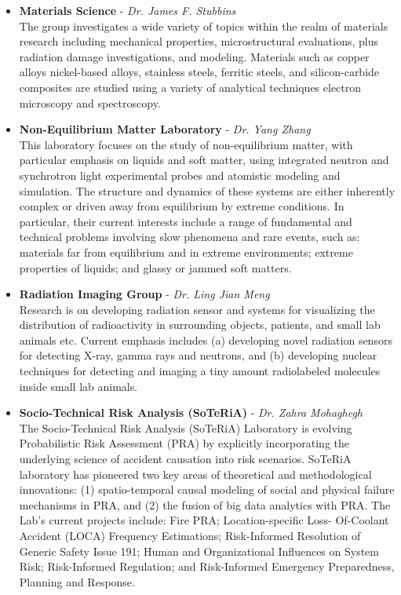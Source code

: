 \begin{itemize}
  \item \textbf{Materials Science} - \textit{Dr. James F. Stubbins}\\
  The group investigates a wide variety of topics within the realm of materials research including mechanical properties, microstructural evaluations, plus radiation damage investigations, and modeling. Materials such as copper alloys nickel-based alloys, stainless steels, ferritic steels, and silicon-carbide composites are studied using a variety of analytical techniques electron microscopy and spectroscopy.


  \item \textbf{Non-Equilibrium Matter Laboratory} - \textit{Dr. Yang Zhang}\\
  This laboratory focuses on the study of non-equilibrium matter, with particular emphasis on liquids and soft matter, using integrated neutron and synchrotron light experimental probes and atomistic modeling and simulation. The structure and dynamics of these systems are either inherently complex or driven away from equilibrium by extreme conditions. In particular, their current interests include a range of fundamental and technical problems involving slow phenomena and rare events, such as: materials far from equilibrium and in extreme environments; extreme properties of liquids; and glassy or jammed soft matters.

  \item \textbf{Radiation Imaging Group} - \textit{Dr. Ling Jian Meng}\\
  Research is on developing radiation sensor and systems for visualizing the distribution of radioactivity in surrounding objects, patients, and small lab animals etc. Current emphasis includes (a) developing novel radiation sensors for detecting X-ray, gamma rays and neutrons, and (b) developing nuclear techniques for detecting and imaging a tiny amount radiolabeled molecules inside small lab animals.

  \item \textbf{Socio-Technical Risk Analysis (SoTeRiA)} - \textit{Dr. Zahra Mohaghegh}\\
  The Socio-Technical Risk Analysis (SoTeRiA) Laboratory is evolving Probabilistic Risk Assessment (PRA) by explicitly incorporating the underlying science of accident causation into risk scenarios. SoTeRiA laboratory has pioneered two key areas of theoretical and methodological innovations: (1) spatio-temporal causal modeling of social and physical failure mechanisms in PRA, and (2) the fusion of big data analytics with PRA. The Lab’s current projects include: Fire PRA; Location-specific Loss- Of-Coolant Accident (LOCA) Frequency Estimations; Risk-Informed Resolution of Generic Safety Issue 191; Human and Organizational Influences on System Risk; Risk-Informed Regulation; and Risk-Informed Emergency Preparedness, Planning and Response.


\end{itemize}
